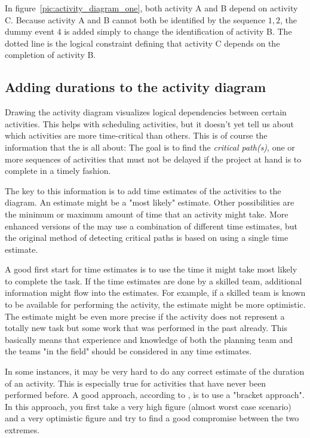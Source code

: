 In figure~\ref{pic:activity_diagram_one}, both activity A and B depend on activity C. Because
activity A and B cannot both be identified by the sequence $1,2$, the dummy event $4$ is added
simply to change the identification of activity B. The dotted line is the logical constraint
defining that activity C depends on the completion of activity B.


\subsection{Adding durations to the activity diagram}
Drawing the activity diagram visualizes logical dependencies between certain activities. This helps
with scheduling activities, but it doesn't yet tell us about which activities are more time-critical
than others. This is of course the information that the \cpm{} is all about: The goal is to find the
\emph{critical path(s)}, one or more sequences of activities that must not be delayed if the project
at hand is to complete in a timely fashion.

The key to this information is to add time estimates of the activities to the diagram. An estimate
might be a "most likely" estimate. Other possibilities are the minimum or maximum amount of time
that an activity might take. More enhanced versions of the \cpm{} may use a combination of different
time estimates, but the original method of detecting critical paths is based on using a single time
estimate. 

A good first start for time estimates is to use the time it might take most likely to complete the
task. If the time estimates are done by a skilled team, additional information might flow into the
estimates. For example, if a skilled team is known to be available for performing the activity, the
estimate might be more optimistic. The estimate might be even more precise if the activity does not
represent a totally new task but some work that was performed in the past already. This basically
means that experience and knowledge of both the planning team and the teams "in the field" should be
considered in any time estimates.

In some instances, it may be very hard to do any correct estimate of the duration of an activity.
This is especially true for activities that have never been performed before. A good approach,
according to \cite[p. 91]{obrien}, is to use a "bracket approach". In this approach, you first take
a very high figure (almost worst case scenario) and a very optimistic figure and try to find a good
compromise between the two extremes.


